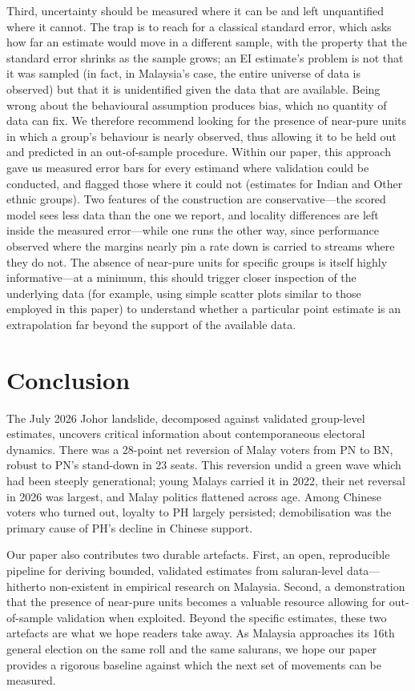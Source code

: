 \documentclass[11pt]{article}
\begin{document}
Third, uncertainty should be measured where it can be and left unquantified where it cannot. The trap is to reach for a classical standard error, which asks how far an estimate would move in a different sample, with the property that the standard error shrinks as the sample grows; an EI estimate's problem is not that it was sampled (in fact, in Malaysia's case, the entire universe of data is observed) but that it is unidentified given the data that are available. Being wrong about the behavioural assumption produces bias, which no quantity of data can fix. We therefore recommend looking for the presence of near-pure units in which a group's behaviour is nearly observed, thus allowing it to be held out and predicted in an out-of-sample procedure. Within our paper, this approach gave us measured error bars for every estimand where validation could be conducted, and flagged those where it could not (estimates for Indian and Other ethnic groups). Two features of the construction are conservative---the scored model sees less data than the one we report, and locality differences are left inside the measured error---while one runs the other way, since performance observed where the margins nearly pin a rate down is carried to streams where they do not. The absence of near-pure units for specific groups is itself highly informative---at a minimum, this should trigger closer inspection of the underlying data (for example, using simple scatter plots similar to those employed in this paper) to understand whether a particular point estimate is an extrapolation far beyond the support of the available data.

\section{Conclusion}
\label{sec:conclusion}

The July 2026 Johor landslide, decomposed against validated group-level estimates, uncovers critical information about contemporaneous electoral dynamics. There was a 28-point net reversion of Malay voters from PN to BN, robust to PN's stand-down in 23 seats. This reversion undid a green wave which had been steeply generational; young Malays carried it in 2022, their net reversal in 2026 was largest, and Malay politics flattened across age. Among Chinese voters who turned out, loyalty to PH largely persisted; demobilisation was the primary cause of PH's decline in Chinese support.

Our paper also contributes two durable artefacts. First, an open, reproducible pipeline for deriving bounded, validated estimates from saluran-level data---hitherto non-existent in empirical research on Malaysia. Second, a demonstration that the presence of near-pure units becomes a valuable resource allowing for out-of-sample validation when exploited. Beyond the specific estimates, these two artefacts are what we hope readers take away. As Malaysia approaches its 16th general election on the same roll and the same salurans, we hope our paper provides a rigorous baseline against which the next set of movements can be measured.
\end{document}
